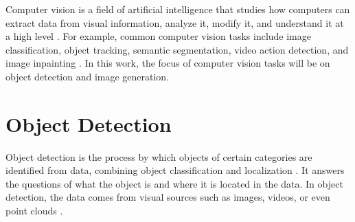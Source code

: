 Computer vision is a field of artificial intelligence that studies how computers can extract data from visual information, analyze it, modify it, and understand it at a high level \cite{Pandey2023, Pulli2012}.
For example, common computer vision tasks include image classification, object tracking, semantic segmentation, video action detection, and image inpainting \cite{Pandey2023, Wang_2023}.
In this work, the focus of computer vision tasks will be on object detection and image generation.
\section{Object Detection}
\label{sec:object_detection}

Object detection is the process by which objects of certain categories are identified from data, combining object classification and localization \cite{object_detection_review, object_detection_20years}.
It answers the questions of what the object is and where it is located in the data.
In object detection, the data comes from visual sources such as images, videos, or even point clouds \cite{object_detection_review, zhou2017voxelnet}.


